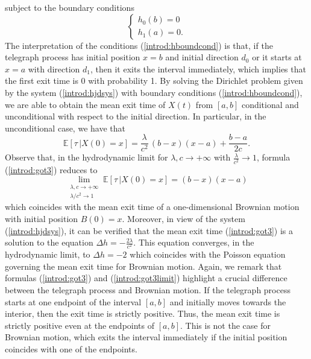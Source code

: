 \documentclass{article}
\begin{document}
subject to the boundary conditions
\begin{equation}\label{introd:hboundcond}
\begin{cases}
h_0(b)=0\\
h_1(a)=0.
\end{cases}
\end{equation} 
The interpretation of the conditions (\ref{introd:hboundcond}) is that, if the telegraph process has initial position $x=b$ and initial direction $d_0$ or it starts at $x=a$ with direction $d_1$, then it exits the interval immediately, which implies that the first exit time is 0 with probability 1. By solving the Dirichlet problem given by the system (\ref{introd:hjdsys}) with boundary conditions (\ref{introd:hboundcond}), we are able to obtain the mean exit time of $X(t)$ from $[a,b]$ conditional and unconditional with respect to the initial direction. In particular, in the unconditional case, we have that 
\begin{equation}\mathbb{E}\left[\tau\,\Big\lvert X(0)=x\right]=\frac{\lambda}{c^2}\,(b-x)(x-a)+\frac{b-a}{2c}.\label{introd:got3}\end{equation}
Observe that, in the hydrodynamic limit for $\lambda,c\to+\infty$ with $\frac{\lambda}{c^2}\to1$, formula (\ref{introd:got3}) reduces to
\begin{equation}\lim_{\substack{\lambda,c\to+\infty\\\lambda/c^2\to1}}\mathbb{E}\left[\tau\,\Big\lvert X(0)=x\right]=(b-x)(x-a)\label{introd:got3limit}\end{equation}
which coincides with the mean exit time of a one-dimensional Brownian motion with initial position $B(0)=x$. Moreover, in view of the system (\ref{introd:hjdsys}), it can be verified that the mean exit time (\ref{introd:got3}) is a solution to the equation $\Delta h=-\frac{2\lambda}{c^2}.$ This equation converges, in the hydrodynamic limit, to $\Delta h=-2$ which coincides with the Poisson equation governing the mean exit time for Brownian motion.
Again, we remark that formulas (\ref{introd:got3}) and (\ref{introd:got3limit}) highlight a crucial difference between the telegraph process and Brownian motion. If the telegraph process starts at one endpoint of the interval $[a,b]$ and initially moves towards the interior, then the exit time is strictly positive. Thus, the mean exit time is strictly positive even at the endpoints of $[a,b]$. This is not the case for Brownian motion, which exits the interval immediately if the initial position coincides with one of the endpoints.\\
\end{document}
